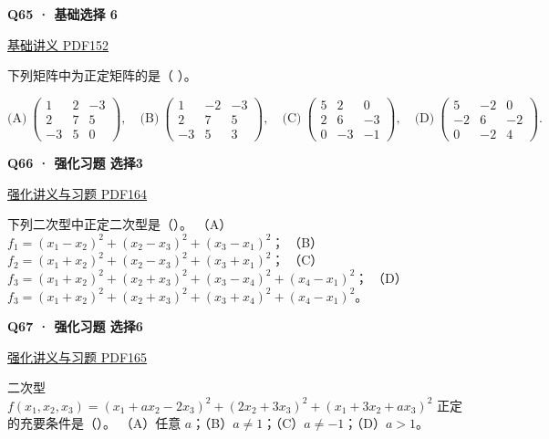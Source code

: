 \documentclass[UTF8,fontset=fandol,11pt,a4paper]{ctexart}
\newcommand{\source}[1]{{\footnotesize\color{Muted}#1\par}}
\newcommand{\qtitle}[2]{\par\needspace{5\baselineskip}\hypertarget{#1}{}\label{#1}\textbf{#2}\par}
\begin{document}
\begin{minipage}{\linewidth}
\qtitle{B-MC-06}{Q65 · 基础选择 6}
\source{\href{file:///Users/skyintelligence/Desktop/\%E5\%BE\%97\%E8\%AF\%BB\%E4\%B8\%AA\%E7\%A0\%94-\%E5\%8C\%97\%E5\%A4\%A7\%E8\%BD\%AF\%E5\%BE\%AE/\%E6\%95\%B0\%E5\%AD\%A6\%20150/\%E8\%AE\%B2\%E4\%B9\%89/\%E3\%80\%90\%E4\%B8\%80\%E9\%AB\%98\%E6\%95\%B0Kira\%E3\%80\%9127\%E8\%80\%83\%E7\%A0\%94\%E7\%BA\%BF\%E4\%BB\%A3\%E5\%9F\%BA\%E7\%A1\%80\%E8\%AE\%B2\%E4\%B9\%89\%26\%E4\%B9\%A0\%E9\%A2\%98-\%E7\%94\%B5\%E5\%AD\%90\%E7\%89\%88.pdf\#page=152}{基础讲义 PDF152}}
下列矩阵中为正定矩阵的是（ ）。

\[
\text{(A)}\ \begin{pmatrix}1&2&-3\\2&7&5\\-3&5&0\end{pmatrix},\quad
\text{(B)}\ \begin{pmatrix}1&-2&-3\\2&7&5\\-3&5&3\end{pmatrix},\quad
\text{(C)}\ \begin{pmatrix}5&2&0\\2&6&-3\\0&-3&-1\end{pmatrix},\quad
\text{(D)}\ \begin{pmatrix}5&-2&0\\-2&6&-2\\0&-2&4\end{pmatrix}.
\]
\end{minipage}\par\vspace{7mm}
\begin{minipage}{\linewidth}
\qtitle{R-MC-03}{Q66 · 强化习题 选择3}
\source{\href{file:///Users/skyintelligence/Desktop/\%E5\%BE\%97\%E8\%AF\%BB\%E4\%B8\%AA\%E7\%A0\%94-\%E5\%8C\%97\%E5\%A4\%A7\%E8\%BD\%AF\%E5\%BE\%AE/\%E6\%95\%B0\%E5\%AD\%A6\%20150/Kira\%C2\%B727\%E7\%BA\%BF\%E6\%80\%A7\%E4\%BB\%A3\%E6\%95\%B0\%E5\%BC\%BA\%E5\%8C\%96\%E8\%AE\%B2\%E4\%B9\%89\%2B\%E4\%B9\%A0\%E9\%A2\%98.pdf\#page=164}{强化讲义与习题 PDF164}}
下列二次型中正定二次型是（\quad）。
（A）$f_1=(x_1-x_2)^2+(x_2-x_3)^2+(x_3-x_1)^2$；
（B）$f_2=(x_1+x_2)^2+(x_2-x_3)^2+(x_3+x_1)^2$；
（C）$f_3=(x_1+x_2)^2+(x_2+x_3)^2+(x_3-x_4)^2+(x_4-x_1)^2$；
（D）$f_3=(x_1+x_2)^2+(x_2+x_3)^2+(x_3+x_4)^2+(x_4-x_1)^2$。
\end{minipage}\par\vspace{7mm}
\begin{minipage}{\linewidth}
\qtitle{R-MC-06}{Q67 · 强化习题 选择6}
\source{\href{file:///Users/skyintelligence/Desktop/\%E5\%BE\%97\%E8\%AF\%BB\%E4\%B8\%AA\%E7\%A0\%94-\%E5\%8C\%97\%E5\%A4\%A7\%E8\%BD\%AF\%E5\%BE\%AE/\%E6\%95\%B0\%E5\%AD\%A6\%20150/Kira\%C2\%B727\%E7\%BA\%BF\%E6\%80\%A7\%E4\%BB\%A3\%E6\%95\%B0\%E5\%BC\%BA\%E5\%8C\%96\%E8\%AE\%B2\%E4\%B9\%89\%2B\%E4\%B9\%A0\%E9\%A2\%98.pdf\#page=165}{强化讲义与习题 PDF165}}
二次型 $f(x_1,x_2,x_3)=(x_1+ax_2-2x_3)^2+(2x_2+3x_3)^2+(x_1+3x_2+ax_3)^2$ 正定的充要条件是（\quad）。
（A）任意 $a$；（B）$a\ne1$；（C）$a\ne-1$；（D）$a>1$。
\end{minipage}\par\vspace{7mm}
\end{document}
